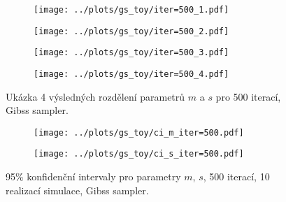 \documentclass[11pt,oneside,american,czech]{article}
\begin{document}
\begin{figure}
	\centering
	\begin{subfigure}{0.45\textwidth}
		\centering
		\texttt{[image: ../plots/gs\_toy/iter=500\_1.pdf]}
	\end{subfigure}
	\hspace{0.5cm}
	\begin{subfigure}{0.45\textwidth}
		\centering
		\texttt{[image: ../plots/gs\_toy/iter=500\_2.pdf]}
	\end{subfigure}
	
	\vspace{2cm}
	
	\begin{subfigure}{0.45\textwidth}
		\centering
		\texttt{[image: ../plots/gs\_toy/iter=500\_3.pdf]}
	\end{subfigure}
	\hspace{0.5cm}
	\begin{subfigure}{0.45\textwidth}
		\centering
		\texttt{[image: ../plots/gs\_toy/iter=500\_4.pdf]}
	\end{subfigure}
	\caption{Ukázka 4 výsledných rozdělení parametrů $m$ a $s$ pro 500 iterací, Gibss sampler.}
	\label{Obr: GS toy 500}
\end{figure}

\begin{figure}
	\centering
	\begin{subfigure}{0.46\textwidth}
		\centering
		\texttt{[image: ../plots/gs\_toy/ci\_m\_iter=500.pdf]}
	\end{subfigure}
	\hspace{0.5cm}
	\begin{subfigure}{0.46\textwidth}
		\centering
		\texttt{[image: ../plots/gs\_toy/ci\_s\_iter=500.pdf]}
	\end{subfigure}
	\caption{95\% konfidenční intervaly pro parametry $m$, $s$, 500 iterací, 10 realizací simulace, Gibss sampler.}
	\label{GS toy 500 CI}
\end{figure}
\end{document}
